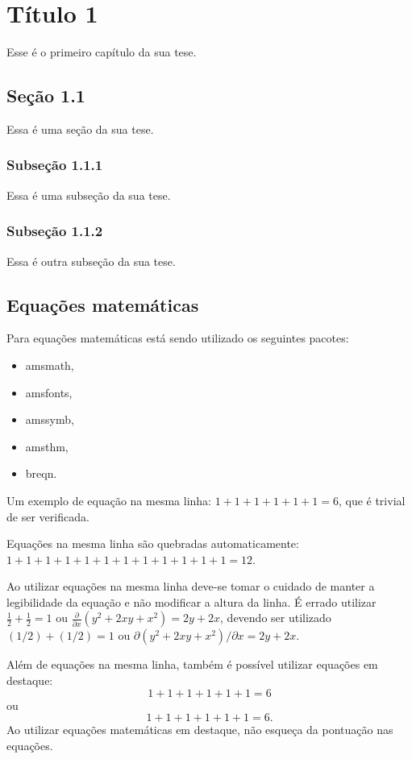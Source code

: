 \chapter{Título 1}
Esse é o primeiro capítulo da sua tese.

\section{Seção 1.1}
Essa é uma seção da sua tese.

\subsection{Subseção 1.1.1}

Essa é uma subseção da sua tese.

\subsection{Subseção 1.1.2}

Essa é outra subseção da sua tese.

\section{Equações matemáticas}
Para equações matemáticas está sendo utilizado os seguintes
pacotes:
\begin{itemize}
  \item amsmath,
  \item amsfonts,
  \item amssymb,
  \item amsthm,
  \item breqn.
\end{itemize}

Um exemplo de equação na mesma linha: 
$ 1 + 1 + 1 + 1 + 1 + 1 = 6$, 
que é trivial de ser verificada.

Equações na mesma linha são quebradas automaticamente:
$ 1 + 1 + 1 + 1 + 1 + 1 + 1 + 1 + 1 + 1 + 1 + 1 = 12$. 

Ao utilizar equações na mesma linha deve-se tomar o cuidado de manter a
legibilidade da equação e não modificar a altura da linha. É
errado utilizar $\frac{1}{2} + \frac{1}{2} = 1$ ou $\frac{\partial}{\partial x}
(y^2 + 2xy + x^2) = 2y + 2x$, devendo ser utilizado $(1/2) + (1/2) = 1$ ou
$\partial (y^2 + 2 x y + x^2) / \partial x = 2 y + 2 x$.

Além de equações na mesma linha, também é possível
utilizar equações em destaque:
\begin{equation}
1 + 1 + 1 + 1 + 1 + 1 = 6
\end{equation}
ou
\begin{equation*}
1 + 1 + 1 + 1 + 1 + 1 = 6.
\end{equation*}
Ao utilizar equações matemáticas em destaque, não esqueça da pontuação nas
equações.

